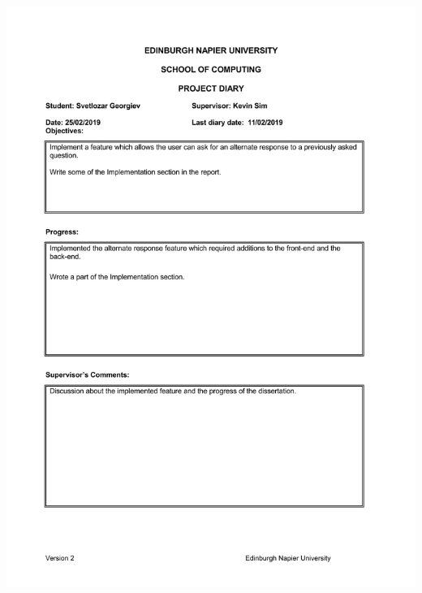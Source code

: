 \documentclass[12pt,a4paper]{article}
\begin{document}
\begin{appendices}
\includegraphics[width=\textwidth,height=\textheight,keepaspectratio]{s2week6.jpg}
\newpage

\end{appendices}
\end{document}
